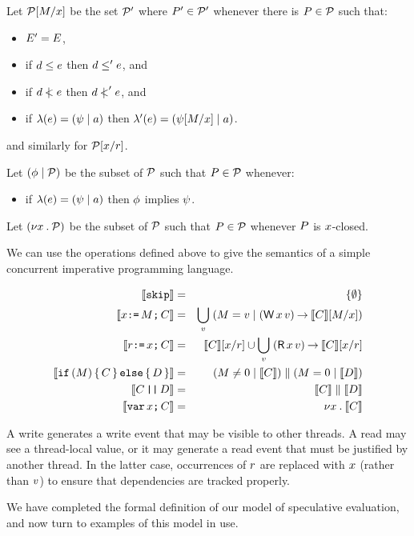 \begin{definition}
Let $\mathcal{P}[M/x]$ be the set $\mathcal{P}'$ where $P'\in\mathcal{P}'$ whenever
there is $P\in\mathcal{P}$ such that:
\begin{itemize}
\item $E' = E$,
\item if $d \le e$ then $d \le' e$, and
\item if $d \mathrel{\,\mid\!\!\!<} e$ then $d \mathrel{\,\mid\!\!\!<}' e$, and
\item if $\lambda(e) = (\psi \mid a)$ then $\lambda'(e) = (\psi[M/x] \mid a)$.
\end{itemize}
and similarly for $\mathcal{P}[x/r]$.
\end{definition}

\begin{definition}
Let $(\phi \mid \mathcal{P})$ be the subset of $\mathcal{P}$ such that $P\in\mathcal{P}$ whenever:
\begin{itemize}
\item if $\lambda(e) = (\psi \mid a)$ then $\phi$ implies $\psi$.
\end{itemize}
\end{definition}

\begin{definition}
Let $(\nu x\mathbin.\mathcal{P})$ be the subset of $\mathcal{P}$ such that $P\in\mathcal{P}$ whenever
$P$ is $x$-closed.
\end{definition}

We can use the operations defined above to give the
semantics of a simple concurrent imperative programming language.

\begin{definition}
\begin{eqnarray*}
  \sem{\SKIP} & = & \{ \emptyset \} \\
  \sem{\aLoc\GETS\aExp\SEMI \aCmd} & = & \bigcup_\aVal\; (\aExp=\aVal \mid (\DW\aLoc\aVal) \prefix \sem{\aCmd}[\aExp/\aLoc]) \\
  \sem{\aReg\GETS\aLoc\SEMI \aCmd} & = & \sem{\aCmd}[\aLoc/\aReg] \cup \bigcup_\aVal\; (\DR\aLoc\aVal) \prefix \sem{\aCmd}[\aLoc/\aReg] \\
  \sem{\IF (\aExp) \THEN \aCmd \ELSE \bCmd \FI} & = & (\aExp \neq 0 \mid \sem{\aCmd}) \parallel (\aExp=0 \mid \sem{\bCmd}) \\
  \sem{\aCmd \PAR \bCmd} & = & \sem{\aCmd} \parallel \sem{\bCmd} \\
  \sem{\VAR\aLoc\SEMI \aCmd} & = & \nu \aLoc \st \sem{\aCmd}
\end{eqnarray*}
\end{definition}

A write generates a write event that may be visible
to other threads.  A read may see a
thread-local value, or it may generate a read event that must be justified by
another thread.  In the latter case, occurrences of $r$ are replaced with
$x$ (rather than $v$) to ensure that dependencies are tracked
properly.

We have completed the formal definition of our model of speculative
evaluation, and now turn to examples of this model in use.
